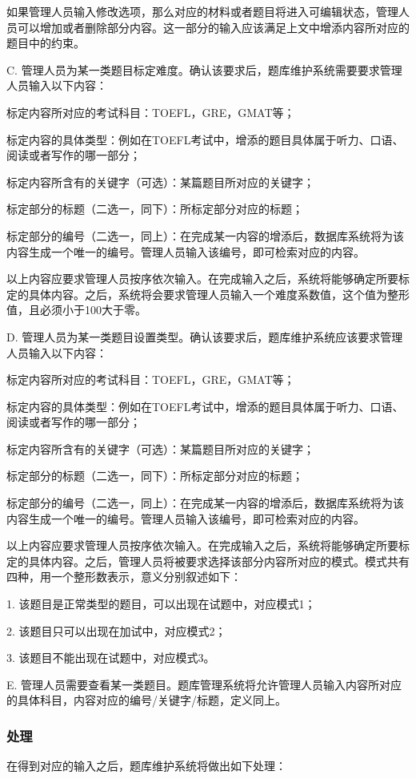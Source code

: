 	如果管理人员输入修改选项，那么对应的材料或者题目将进入可编辑状态，管理人员可以增加或者删除部分内容。这一部分的输入应该满足上文中增添内容所对应的题目中的约束。

C. 管理人员为某一类题目标定难度。确认该要求后，题库维护系统需要要求管理人员输入以下内容：

	标定内容所对应的考试科目：TOEFL，GRE，GMAT等；

	标定内容的具体类型：例如在TOEFL考试中，增添的题目具体属于听力、口语、阅读或者写作的哪一部分；

	标定内容所含有的关键字（可选）：某篇题目所对应的关键字；

	标定部分的标题（二选一，同下）：所标定部分对应的标题；

	标定部分的编号（二选一，同上）：在完成某一内容的增添后，数据库系统将为该内容生成一个唯一的编号。管理人员输入该编号，即可检索对应的内容。

以上内容应要求管理人员按序依次输入。在完成输入之后，系统将能够确定所要标定的具体内容。之后，系统将会要求管理人员输入一个难度系数值，这个值为整形值，且必须小于100大于零。

D. 管理人员为某一类题目设置类型。确认该要求后，题库维护系统应该要求管理人员输入以下内容：

	标定内容所对应的考试科目：TOEFL，GRE，GMAT等；

	标定内容的具体类型：例如在TOEFL考试中，增添的题目具体属于听力、口语、阅读或者写作的哪一部分；

	标定内容所含有的关键字（可选）：某篇题目所对应的关键字；

	标定部分的标题（二选一，同下）：所标定部分对应的标题；

	标定部分的编号（二选一，同上）：在完成某一内容的增添后，数据库系统将为该内容生成一个唯一的编号。管理人员输入该编号，即可检索对应的内容。

以上内容应要求管理人员按序依次输入。在完成输入之后，系统将能够确定所要标定的具体内容。之后，管理人员将被要求选择该部分内容所对应的模式。模式共有四种，用一个整形数表示，意义分别叙述如下：

	1. 该题目是正常类型的题目，可以出现在试题中，对应模式1；

	2. 该题目只可以出现在加试中，对应模式2；

	3. 该题目不能出现在试题中，对应模式3。

E. 管理人员需要查看某一类题目。题库管理系统将允许管理人员输入内容所对应的具体科目，内容对应的编号/关键字/标题，定义同上。
	
\subsubsection{处理}
在得到对应的输入之后，题库维护系统将做出如下处理：

